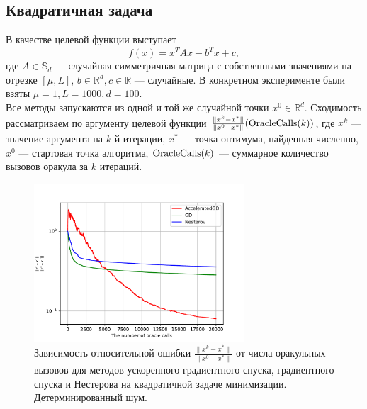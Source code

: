 \documentclass{article}
\newcommand{\R}{\mathbb{R}}
\begin{document}
\subsection{Квадратичная задача}
В качестве целевой функции выступает
\begin{equation}
 f(x) = x^T A x - b^T x + c,
\end{equation}
где $A \in \mathbb{S}_d$ --- случайная симметричная матрица с собственными значениями на отрезке $[\mu, L]$, $b \in \R^d, c \in \R$ --- случайные. В конкретном эксперименте были взяты $\mu = 1, L = 1000, d = 100$.\\
Все методы запускаются из одной и той же случайной точки $x^0 \in \R^d$.
Сходимость рассматриваем по аргументу целевой функции $\frac{\|x^k - x^*\|}{\|x^0 - x^*\|}(\textnormal{OracleCalls}(k))$, где $x^k$ --- значение аргумента на $k$-й итерации, $x^*$ --- точка оптимума, найденная численно, $x^0$ --- стартовая точка алгоритма, $\textnormal{OracleCalls}(k)$ --- суммарное количество вызовов оракула за $k$ итераций.
\begin{figure}[!htbp]
\centering
  \includegraphics[width=0.7\textwidth]{../figures/Deterministic_quadratic_AGD_GD_Nesterov_18.pdf}
 \caption{Зависимость относительной ошибки $\frac{\|x^k - x^*\|}{\|x^0 - x^*\|}$ от числа оракульных вызовов для методов ускоренного градиентного спуска, градиентного спуска и Нестерова на квадратичной задаче минимизации. Детерминированный шум.}
  \label{fig:non-stochastic_logreg}
\end{figure}
\end{document}
